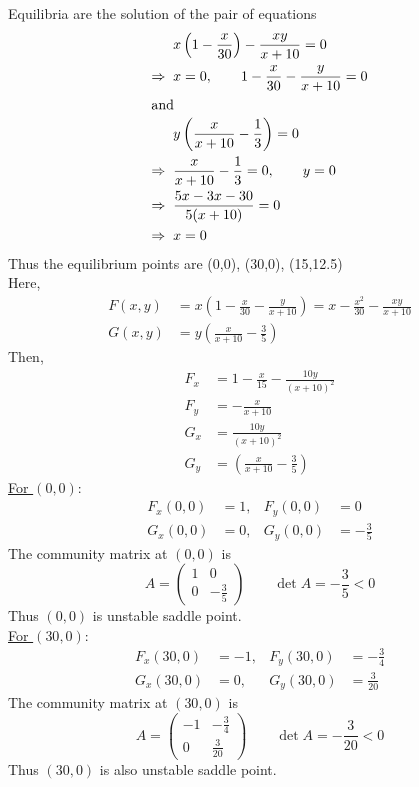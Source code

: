 \documentclass[../main-sheet.tex]{subfiles}
\begin{document}
\begin{soln}
    Equilibria are the solution of the pair of equations
    \begin{align*}
        &x\left( 1-\frac{x}{30} \right)-\frac{xy}{x+10}=0\\
        \Rightarrow\;\;&x=0,\qquad1-\frac{x}{30}-\frac{y}{x+10}=0\\
        \intertext{and}
        &y\left( \frac{x}{x+10}-\frac{1}{3} \right)=0\\
        \Rightarrow\;\;&\frac{x}{x+10}-\frac{1}{3} =0,\qquad y=0\\
        \Rightarrow\;\;&\frac{5x-3x-30}{5(x+10)}=0\\
        \Rightarrow\;\;&x=0\\
    \end{align*}
    Thus the equilibrium points are (0,0), (30,0), (15,12.5)\\
    Here, \begin{align*}
        F(x,y)&=x\left( 1-\frac{x}{30}-\frac{y}{x+10} \right)= x-\frac{x^2}{30}-\frac{xy}{x+10}\\
        G(x,y)&=y\left( \frac{x}{x+10}-\frac{3}{5} \right)
    \end{align*}
    Then,
    \begin{align*}
        F_x&=1-\frac{x}{15}-\frac{10y}{(x+10)^2}\\
        F_y&=-\frac{x}{x+10}\\
        G_x&=\frac{10y}{(x+10)^2}\\
        G_y&=\left( \frac{x}{x+10}-\frac{3}{5} \right)
    \end{align*}
    \underline{For \((0,0)\)}:\begin{align*}
        F_x(0,0)&=1, &F_y(0,0)&=0\\
        G_x(0,0)&=0, &G_y(0,0)&=-\frac{3}{5}
    \end{align*}
    The community matrix at \((0,0)\) is 
    \[A=\begin{pmatrix}
        1&0\\
        0&-\frac{3}{5}
    \end{pmatrix}\qquad \det A=-\frac{3}{5}<0\]
    Thus \((0,0)\) is unstable saddle point.\\
    
    
    \underline{For \((30,0)\)}:\begin{align*}
        F_x(30,0)&=-1, &F_y(30,0)&=-\frac{3}{4}\\
        G_x(30,0)&=0, &G_y(30,0)&=\frac{3}{20}
    \end{align*}
    The community matrix at \((30,0)\) is 
    \[A=\begin{pmatrix}
        -1&-\frac{3}{4}\\
        0&\frac{3}{20}
    \end{pmatrix}\qquad \det A=-\frac{3}{20}<0\]
    Thus \((30,0)\) is also unstable saddle point.\\


\end{soln}
\end{document}
